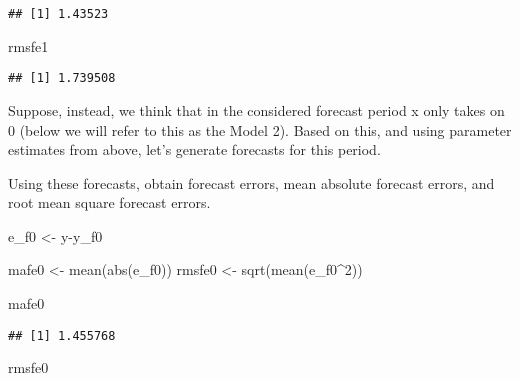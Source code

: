 \documentclass[
  oneside]{book}
\newenvironment{Shaded}{\begin{snugshade}}{\end{snugshade}}
\newcommand{\DecValTok}[1]{\textcolor[rgb]{0.00,0.00,0.81}{#1}}
\newcommand{\FunctionTok}[1]{\textcolor[rgb]{0.00,0.00,0.00}{#1}}
\newcommand{\NormalTok}[1]{#1}
\newcommand{\OtherTok}[1]{\textcolor[rgb]{0.56,0.35,0.01}{#1}}
\newcommand{\SpecialCharTok}[1]{\textcolor[rgb]{0.00,0.00,0.00}{#1}}
\begin{document}
\begin{verbatim}
## [1] 1.43523
\end{verbatim}

\begin{Shaded}
\begin{Highlighting}[]
\NormalTok{rmsfe1}
\end{Highlighting}
\end{Shaded}

\begin{verbatim}
## [1] 1.739508
\end{verbatim}

Suppose, instead, we think that in the considered forecast period x only takes on 0 (below we will refer to this as the Model 2). Based on this, and using parameter estimates from above, let's generate forecasts for this period.

\begin{Shaded}
\end{Shaded}

Using these forecasts, obtain forecast errors, mean absolute forecast errors, and root mean square forecast errors.

\begin{Shaded}
\begin{Highlighting}[]
\NormalTok{e\_f0 }\OtherTok{\textless{}{-}}\NormalTok{ y}\SpecialCharTok{{-}}\NormalTok{y\_f0}

\NormalTok{mafe0 }\OtherTok{\textless{}{-}} \FunctionTok{mean}\NormalTok{(}\FunctionTok{abs}\NormalTok{(e\_f0))}
\NormalTok{rmsfe0 }\OtherTok{\textless{}{-}} \FunctionTok{sqrt}\NormalTok{(}\FunctionTok{mean}\NormalTok{(e\_f0}\SpecialCharTok{\^{}}\DecValTok{2}\NormalTok{))}

\NormalTok{mafe0}
\end{Highlighting}
\end{Shaded}

\begin{verbatim}
## [1] 1.455768
\end{verbatim}

\begin{Shaded}
\begin{Highlighting}[]
\NormalTok{rmsfe0}
\end{Highlighting}
\end{Shaded}
\end{document}
